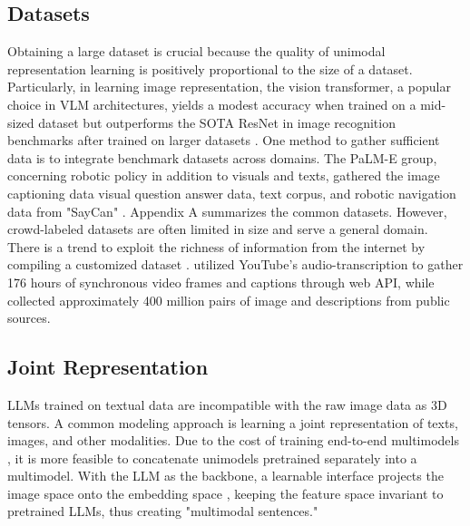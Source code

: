 \documentclass[11pt]{article}
\begin{document}
\subsection{Datasets}
Obtaining a large dataset is crucial because the quality of unimodal representation learning is positively proportional to the size of a dataset. Particularly, in learning image representation, the vision transformer, a popular choice in VLM architectures, yields a modest accuracy when trained on a mid-sized dataset but outperforms the SOTA ResNet in image recognition benchmarks after trained on larger datasets \citep{DBLP:conf/iclr/DosovitskiyB0WZ21}. One method to gather sufficient data is to integrate benchmark datasets across domains. The PaLM-E group, concerning robotic policy in addition to visuals and texts, gathered the image captioning data visual question answer data, text corpus, and robotic navigation data from "SayCan" \citet{DBLP:conf/icml/DriessXSLCIWTVY23}. Appendix A summarizes the common datasets. However, crowd-labeled datasets are often limited in size and serve a general domain. There is a trend to exploit the richness of information from the internet by compiling a customized dataset \citep{DBLP:conf/icml/RadfordKHRGASAM21}. \citet{DBLP:conf/iccv/SunMV0S19} utilized YouTube's audio-transcription to gather 176 hours of synchronous video frames and captions through web API, while \citet{DBLP:conf/icml/RadfordKHRGASAM21} collected approximately 400 million pairs of image and descriptions from public sources. 


\subsection{Joint Representation}
LLMs trained on textual data are incompatible with the raw image data as 3D tensors. A common modeling approach is learning a joint representation of texts, images, and other modalities. Due to the cost of training end-to-end multimodels \citep{DBLP:journals/corr/abs-2306-13549}, it is more feasible to concatenate unimodels pretrained separately into a multimodel. With the LLM as the backbone, a learnable interface projects the image space onto the embedding space \citep{DBLP:journals/corr/abs-2306-13549}, keeping the feature space invariant to pretrained LLMs, thus creating "multimodal sentences." 
\end{document}
